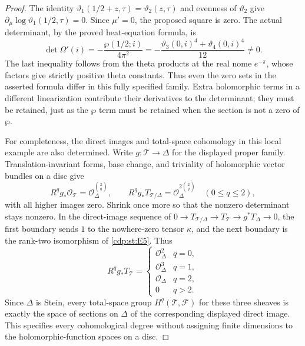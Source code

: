 \begin{proof}
The identity $\vartheta_1(1/2+z,\tau)=\vartheta_2(z,\tau)$
and evenness of $\vartheta_2$ give
$\partial_\mu\log\vartheta_1(1/2,\tau)=0$. Since $\mu'=0$,
the proposed square is zero. The actual determinant, by the
proved heat-equation formula, is
\[
 \det\Omega'(i)=-\frac{\wp(1/2;i)}{4\pi^2}
 =-\frac{\vartheta_3(0,i)^4+\vartheta_4(0,i)^4}{12}\ne0.
\]
The last inequality follows from the theta products at the real
nome $e^{-\pi}$, whose factors give strictly positive theta
constants. Thus even the zero sets in the asserted formula
differ in this fully specified family. Extra holomorphic terms
in a different linearization contribute their derivatives to
the determinant; they must be retained, just as the $\wp$ term
must be retained when the section is not a zero of $\wp$.

For completeness, the direct images and total-space cohomology
in this local example are also determined. Write
$g:\mathscr T\to\Delta$ for the displayed proper family.
Translation-invariant forms, base change, and triviality of
holomorphic vector bundles on a disc give
\[
 R^qg_*\mathcal O_{\mathscr T}
   =\mathcal O_\Delta^{\binom2q},\qquad
 R^qg_*T_{\mathscr T/\Delta}
   =\mathcal O_\Delta^{2\binom2q}\quad(0\leq q\leq2),
\]
with all higher images zero. Shrink once more so that the
nonzero determinant stays nonzero. In the direct-image sequence
of $0\to T_{\mathscr T/\Delta}\to T_{\mathscr T}
\to g^*T_\Delta\to0$, the first boundary sends $1$ to the
nowhere-zero tensor $\kappa$, and the next boundary is the
rank-two isomorphism of \ref{cdp:st:E5}. Thus
\[
 R^qg_*T_{\mathscr T}=
 \begin{cases}
  \mathcal O_\Delta^2&q=0,\\
  \mathcal O_\Delta^3&q=1,\\
  \mathcal O_\Delta&q=2,\\
  0&q>2.
 \end{cases}
\]
Since $\Delta$ is Stein, every total-space group
$H^q(\mathscr T,\mathcal F)$ for these three sheaves is exactly
the space of sections on $\Delta$ of the corresponding displayed
direct image. This specifies every cohomological degree without
assigning finite dimensions to the holomorphic-function spaces
on a disc.
\end{proof}

